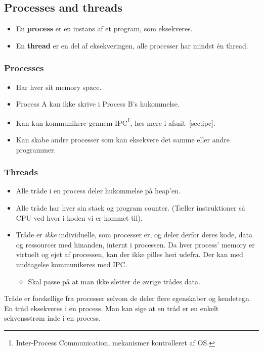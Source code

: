 \subsection{Processes and threads}
\begin{itemize}
	\item En \textbf{process} er en instans af et program, som eksekveres.
	\item En \textbf{thread} er en del af eksekveringen, alle processer har mindst én thread.
\end{itemize}

\subsubsection{Processes}
\begin{itemize}
	\item Har hver sit memory space.
	\item Process A kan ikke skrive i Process B's hukommelse.
	\item Kan kun kommunikere gennem IPC\footnote{Inter-Process Communication, mekanismer kontrolleret af OS.}, læs mere i afsnit~\ref{sec:ipc}.
	\item Kan skabe andre processer som kan eksekvere det samme eller andre programmer.
\end{itemize}

\subsubsection{Threads}
\begin{itemize}
	\item Alle tråde i en process deler hukommelse på heap'en.
	\item Alle tråde har hver sin stack og program counter. (Tæller instruktioner så CPU ved hvor i koden vi er kommet til).
	\item Tråde er \textit{ikke} individuelle, som processer er, og deler derfor deres kode, data og ressourcer med hinanden, internt i processen. Da hver process' memory er virtuelt og ejet af processen, kan der ikke pilles heri udefra. Der kan med undtagelse kommunikeres med IPC.
	\begin{itemize}
		\item Skal passe på at man ikke sletter de øvrige trådes data.
	\end{itemize}
\end{itemize}

Tråde er forskellige fra processer selvom de deler flere egenskaber og kendetegn. En tråd eksekveres i en process. Man kan sige at en tråd er en enkelt sekvensstrøm inde i en process.

